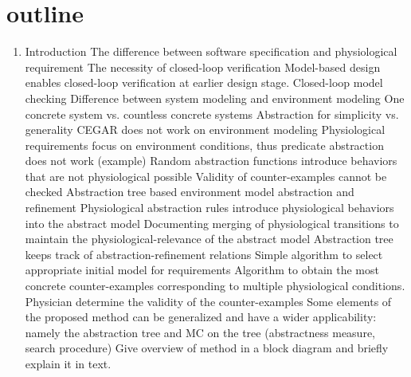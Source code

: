 \section{outline}

\begin{enumerate}
	\item Introduction
	\subitem The difference between software specification and physiological requirement
	\subitem The necessity of closed-loop verification
	\subitem Model-based design enables closed-loop verification at earlier design stage.
	\subitem Closed-loop model checking
	\subitem Difference between system modeling and environment modeling
	\subsubitem One concrete system vs. countless concrete systems
	\subsubitem Abstraction for simplicity vs. generality
	\subitem CEGAR does not work on environment modeling
	\subsubitem Physiological requirements focus on environment conditions, thus predicate abstraction does not work (example)
	\subsubitem Random abstraction functions introduce behaviors that are not physiological possible
	\subsubitem Validity of counter-examples cannot be checked
	\subitem Abstraction tree based environment model abstraction and refinement
	\subsubitem Physiological abstraction rules introduce physiological behaviors into the abstract model
	\subsubitem Documenting merging of physiological transitions to maintain the physiological-relevance of the abstract model
	\subsubitem Abstraction tree keeps track of abstraction-refinement relations
	\subsubitem Simple algorithm to select appropriate initial model for requirements
	\subsubitem Algorithm to obtain the most concrete counter-examples corresponding to multiple physiological conditions.
	\subsubitem Physician determine the validity of the counter-examples
	\subitem Some elements of the proposed method can be generalized and have a wider applicability: namely the abstraction tree and MC on the tree (abstractness measure, search procedure)
	\subitem Give overview of method in a block diagram and briefly explain it in text.
	

\end{enumerate}
